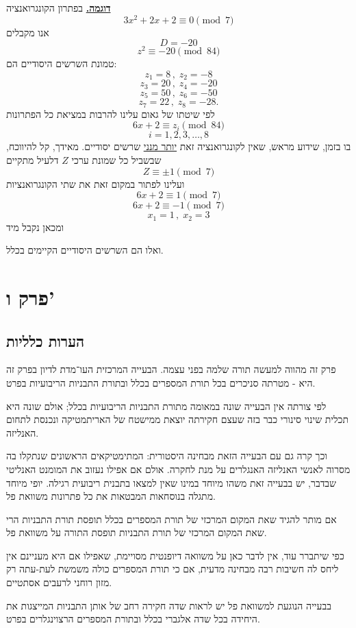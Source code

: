 \bigskip
\noindent\textbf{\underline{דוגמה.}}
בפתרון הקונגרואנציה
\[ 3x^2 + 2x + 2 \equiv 0 \pmod{7} \]
אנו מקבלים
\[ D = -20 \]
\[ z^2 \equiv -20 \pmod{84} \]
טמונת השרשים היסודיים הם:
\[ z_1 = 8 \, , \; z_2 = -8 \]
\[ z_3 = 20 \, , \; z_4 = -20 \]
\[ z_5 = 50 \, , \; z_6 = -50 \]
\[ z_7 = 22 \, , \; z_8 = -28 . \]
לפי שיטתו של גאום עלינו להרבות במציאת כל הפתרונות
\[ 6x + 2 \equiv z_i \pmod{84} \]
\[ i = 1, 2, 3, \ldots, 8 \]
בו בזמן, שידוע מראש, שאין לקונגרואנציה זאת \underline{יותר מנני} שרשים
יסודיים.
מאידך, קל להיווכח, שבשביל כל שמונת ערכי $Z$ דלעיל מתקיים
\[ Z \equiv \pm 1 \pmod{7} \]
ועלינו לפתור במקום זאת את שתי הקונגרואנציות
\[ 6x + 2 \equiv 1 \pmod{7} \]
\[ 6x + 2 \equiv -1 \pmod{7} \]
\[ x_1 = 1 \, , \; x_2 = 3 \]
ומכאן נקבל מיד

ואלו הם השרשים היסודיים הקיימים בכלל.

\section*{פרק ו'}

\subsection*{הערות כלליות}

פרק זה מהווה למעשה תורה שלמה בפני עצמה. הבעייה המרכזית העו־מדת לדיון בפרק זה היא - מטרתה סניכרים בכל תורת המספרים בכלל ובתורת התבניות הריבועיות בפרט.

לפי צורתה אין הבעייה שונה במאומה מתורת התבניות הריבועיות בכלל; אולם שונה היא תכלית שינוי סינורי כבר בזה שעצם חקירתה יוצאת ממישטח של האריתמטיקה ונכנסת לתחום האנליזה.

וכך קרה גם עם הבעייה הזאת מבחינה היסטורית: המתימטיקאים הראשונים שנתקלו בה מסרוה לאנשי האנליזה האנגלרים על מנת לחקרה. אולם אם אפילו נעזוב את המומנט האנליטי שבדבר, יש בבעייה זאת משהו מיוחד במינו שאין למצאו בתבנית ריבועית רגילה. יופי מיוחד מתגלה בנוסחאות המבטאות את כל פתרונות משוואת פל.

אם מותר להגיד שאת המקום המרכזי של תורת המספרים בכלל תופסת תורת התבניות הרי שאת המקום המרכזי של תורת התבניות תופסת התורה על משוואת פל.

כפי שיתברר עוד, אין לדבר כאן על משוואה דיופנטית מסויימת, שאפילו אם היא מעניינם אין ליחס לה חשיבות רבה מבחינה מדעית, אם כי תורת המספרים כולה משמשת לעת-עתה רק מזון רוחני לרעבים אסתטיים.

בבעייה הנוגעת למשוואת פל יש לראות שדה חקירה רחב של אותן התבניות המייצגות את היחידה בכל שדה אלגברי בכלל ובתורת המספרים הרצוינגלרים בפרט.

